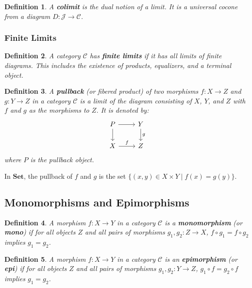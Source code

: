 \documentclass{article}
\newtheorem{definition}{Definition}[section]
\begin{document}
\begin{definition}
A \textbf{colimit} is the dual notion of a limit. It is a universal cocone from a diagram $D \colon \mathcal{J} \to \mathcal{C}$.
\end{definition}

\subsubsection{Finite Limits}

\begin{definition}
A category $\mathcal{C}$ has \textbf{finite limits} if it has all limits of finite diagrams. This includes the existence of products, equalizers, and a terminal object.
\end{definition}

\begin{definition}
A \textbf{pullback} (or fibered product) of two morphisms $f \colon X \to Z$ and $g \colon Y \to Z$ in a category $\mathcal{C}$ is a limit of the diagram consisting of $X$, $Y$, and $Z$ with $f$ and $g$ as the morphisms to $Z$. It is denoted by:
\[
\begin{tikzcd}
P \arrow[r] \arrow[d] & Y \arrow[d, "g"] \\
X \arrow[r, "f"] & Z
\end{tikzcd}
\]
where $P$ is the pullback object.
\end{definition}

In $\mathbf{Set}$, the pullback of $f$ and $g$ is the set $\{ (x,y) \in X \times Y \mid f(x) = g(y) \}$.

\subsection{Monomorphisms and Epimorphisms}

\begin{definition}
A morphism $f \colon X \to Y$ in a category $\mathcal{C}$ is a \textbf{monomorphism} (or \textbf{mono}) if for all objects $Z$ and all pairs of morphisms $g_1, g_2 \colon Z \to X$, $f \circ g_1 = f \circ g_2$ implies $g_1 = g_2$.
\end{definition}

\begin{definition}
A morphism $f \colon X \to Y$ in a category $\mathcal{C}$ is an \textbf{epimorphism} (or \textbf{epi}) if for all objects $Z$ and all pairs of morphisms $g_1, g_2 \colon Y \to Z$, $g_1 \circ f = g_2 \circ f$ implies $g_1 = g_2$.
\end{definition}
\end{document}
